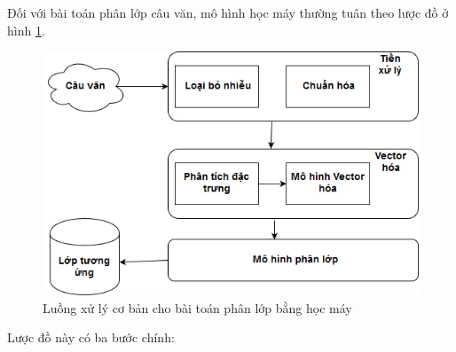 \documentclass[14pt]{extreport}
\begin{document}
Đối với bài toán phân lớp câu văn, mô hình học máy thường tuân theo lược đồ ở hình \ref{fig:classication_pipeline}.

\begin{figure}[!ht]
    \centering
    \includegraphics[scale=0.9]{image/Ml_Class_pipeline.png}
    \caption{Luồng xử lý cơ bản cho bài toán phân lớp bằng học máy}
    \label{fig:classication_pipeline}
\end{figure}
Lược đồ này có ba bước chính:
\end{document}
